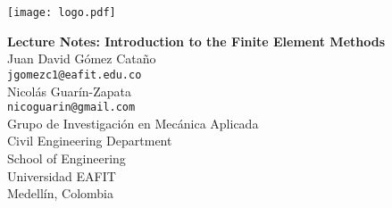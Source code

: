 %
\begin{center}
\texttt{[image: logo.pdf]}\par

\Large{\textbf{Lecture Notes: Introduction to the Finite Element Methods}}
\large
\\[30mm]
Juan David Gómez Cata\~no\\
\texttt{jgomezc1@eafit.edu.co}\\
Nicolás Guarín-Zapata\\
\texttt{nicoguarin@gmail.com}
\\[20mm]
Grupo de Investigación en Mecánica Aplicada
\\
Civil Engineering Department
\\
School of Engineering
\\
Universidad EAFIT
\\
Medellín, Colombia
\\
\the\year
\end{center}
\thispagestyle{empty}